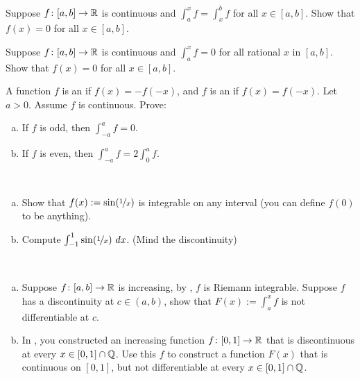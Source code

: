 \begin{exercise}
Suppose $f \colon [a,b] \to {\mathbb{R}}$ is continuous and
$\int_a^x f = \int_x^b f$ for all $x \in [a,b]$.  Show that $f(x) = 0$
for all $x \in [a,b]$.
\end{exercise}

\begin{exercise}
Suppose $f \colon [a,b] \to {\mathbb{R}}$ is continuous and
$\int_a^x f = 0$ for all rational $x$ in $[a,b]$.  Show that $f(x) = 0$
for all $x \in [a,b]$.
\end{exercise}

\begin{samepage}
\begin{exercise}
A function $f$ is an \emph{} if $f(x) = -f(-x)$,
and $f$ is an \emph{} if $f(x) = f(-x)$.  Let $a >
0$.  Assume $f$ is continuous.  Prove:
\begin{enumerate}[a)]
\item
If $f$ is odd, then $\int_{-a}^a f = 0$.
\item
If $f$ is even, then $\int_{-a}^a f = 2 \int_0^a f$.
\end{enumerate}
\end{exercise}
\end{samepage}

\begin{exercise}
{\ }
\begin{enumerate}[a)]
\item
Show that $f(x) := \sin(\nicefrac{1}{x})$
is integrable on any interval (you can define $f(0)$ to be anything).
\item
Compute $\int_{-1}^1 \sin(\nicefrac{1}{x})~dx$.  (Mind the
discontinuity)
\end{enumerate}
\end{exercise}

\begin{exercise}
{\ }
\begin{enumerate}[a)]
\item
Suppose $f \colon [a,b] \to {\mathbb{R}}$ is increasing, by
,
$f$ is Riemann integrable.  Suppose $f$ has a discontinuity at $c \in
(a,b)$, show that $F(x) := \int_a^x f$ is not differentiable at $c$.
\item
In , you constructed an increasing
function $f \colon [0,1] \to {\mathbb{R}}$ that is discontinuous at every
$x \in [0,1] \cap {\mathbb{Q}}$.  Use this $f$ to construct a function $F(x)$ that is
continuous on $[0,1]$, but not differentiable at every $x \in [0,1] \cap {\mathbb{Q}}$.
\end{enumerate}
\end{exercise}

